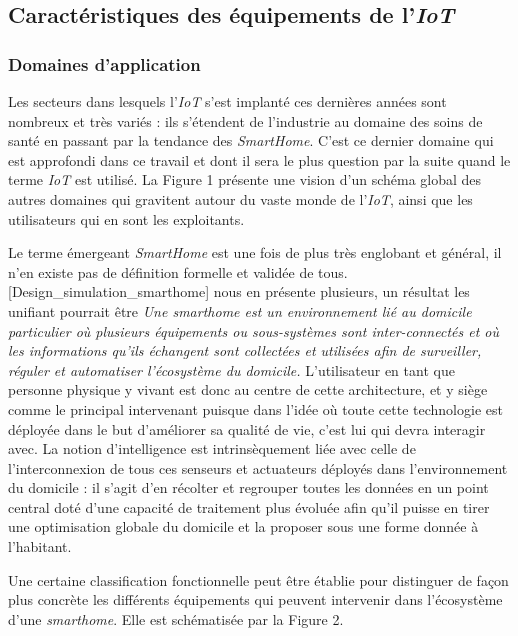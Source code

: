 \documentclass[]{article}
\begin{document}
\subsection{Caractéristiques des équipements de l'\textit{IoT}}

\subsubsection{Domaines d'application}

Les secteurs dans lesquels l'\textit{IoT} s'est implanté ces dernières années sont nombreux et très variés : ils s'étendent de l'industrie au domaine des soins de santé en passant par la tendance des \textit{SmartHome}. C'est ce dernier domaine qui est approfondi dans ce travail et dont il sera le plus question par la suite quand le terme \textit{IoT} est utilisé. La Figure 1 présente une vision d'un schéma global des autres domaines qui gravitent autour du vaste monde de l'\textit{IoT}, ainsi que les utilisateurs qui en sont les exploitants.\\

\newpage

\par Le terme émergeant \textit{SmartHome} est une fois de plus très englobant et général, il n'en existe pas de définition formelle et validée de tous. [Design\_simulation\_smarthome] nous en présente plusieurs, un résultat les unifiant pourrait être \textit{Une smarthome est un environnement lié au domicile particulier où plusieurs équipements ou sous-systèmes sont inter-connectés et où les informations qu'ils échangent sont collectées et utilisées afin de surveiller, réguler et automatiser l'écosystème du domicile.} L'utilisateur en tant que personne physique y vivant est donc au centre de cette architecture, et y siège comme le principal intervenant puisque dans l'idée où toute cette technologie est déployée dans le but d'améliorer sa qualité de vie, c'est lui qui devra interagir avec. La notion d'intelligence est intrinsèquement liée avec celle de l'interconnexion de tous ces senseurs et actuateurs déployés dans l'environnement du domicile : il s'agit d'en récolter et regrouper toutes les données en un point central doté d'une capacité de traitement plus évoluée afin qu'il puisse en tirer une optimisation globale du domicile et la proposer sous une forme donnée à l'habitant.\\

\par Une certaine classification fonctionnelle peut être établie pour distinguer de façon plus concrète les différents équipements qui peuvent intervenir dans l'écosystème d'une \textit{smarthome}. Elle est schématisée par la Figure 2. 
\end{document}
